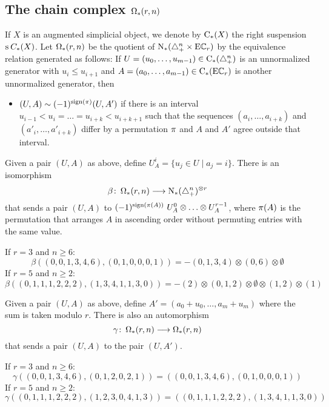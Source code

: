 \subsection{The chain complex \texorpdfstring{$\operatorname{\Omega}_{*}(r,n)$}{Omega(r,n)}} If $X$ is an augmented simplicial object, we denote by $\operatorname{C}_{*}(X)$ the right suspension $\operatorname{s}^{}C_{*}(X)$. Let $\operatorname{\Omega}_{*}(r,n)$ be the quotient of $\operatorname{N}_{*}(\triangle_{+}^{n}\times \mathrm{E}\mathbb{C}_r)$ by the equivalence relation generated as follows: If $U = (u_0,\ldots,u_{m-1})\in \operatorname{C}_{*}(\triangle_{+}^n)$ is an unnormalized generator with $u_i\leq u_{i+1}$ and $A = (a_0,\ldots,a_{m-1})\in \operatorname{C}_{*}(\mathrm{E}\mathbb{C}_r)$ is another unnormalized generator, then
\begin{itemize}
	\item $(U,A)\sim (-1)^{\operatorname{sign}(\pi)}(U,A')$ if there is an interval $u_{i-1}<u_i =\ldots =u_{i+k}<u_{i+k+1}$ such that the sequences $(a_i,\ldots,a_{i+k})$ and $(a'_i,\ldots,a'_{i+k})$ differ by a permutation $\pi$ and $A$ and $A'$ agree outside that interval.
\end{itemize}

Given a pair $(U,A)$ as above, define $U_A^i = \{u_j\in U\mid a_j=i\}$. There is an isomorphism
\[
	\beta\colon \operatorname{\Omega}_{*}(r,n)\longrightarrow \operatorname{N}_{*}(\triangle_{+}^n)^{\otimes r}
\]
that sends a pair $(U,A)$ to $(-1)^{\operatorname{sign}(\pi(A))}\ U_A^0\otimes \ldots\otimes U_A^{r-1}$, where $\pi(A)$ is the permutation that arranges $A$ in ascending order without permuting entries with the same value.
\begin{example}\label{example:beta} If $r=3$ and $n\geq 6$:
\[
		\beta((0,0,1,3,4,6),(0,1,0,0,0,1)) = -(0,1,3,4)\otimes (0,6)\otimes \emptyset
	\]
If $r=5$ and $n\geq 2$:
	\[
		\beta((0,1,1,1,2,2,2),(1,3,4,1,1,3,0)) = -(2)\otimes (0,1,2)\otimes \emptyset\otimes (1,2)\otimes (1)
	\]
	\end{example}



Given a pair $(U,A)$ as above, define $A' = (a_0+u_0,\ldots,a_m+u_m)$ where the sum is taken modulo $r$. There is also an automorphism
\[
	\gamma\colon \operatorname{\Omega}_{*}(r,n)\longrightarrow \operatorname{\Omega}_{*}(r,n)
\]
that sends a pair $(U,A)$ to the pair $(U,A')$.
	\begin{example}\label{example:gamma} If $r=3$ and $n\geq 6$:
	\[
		\gamma((0,0,1,3,4,6),(0,1,2,0,2,1)) = ((0,0,1,3,4,6),(0,1,0,0,0,1))
	\]
If $r=5$ and $n\geq 2$:
	\[
		\gamma((0,1,1,1,2,2,2),(1,2,3,0,4,1,3)) = ((0,1,1,1,2,2,2),(1,3,4,1,1,3,0))
		\]
\end{example}

